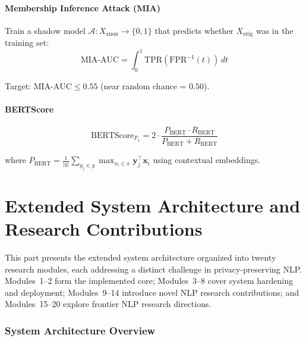 \documentclass[11pt, a4paper]{article}
\newcommand{\Xorig}{X_{\text{orig}}}
\newcommand{\Xanon}{X_{\text{anon}}}
\begin{document}
\subsection{Membership Inference Attack (MIA)}

Train a shadow model $\mathcal{A}: \Xanon \rightarrow \{0, 1\}$ that predicts whether $\Xorig$ was in the training set:
\begin{equation}
\text{MIA-AUC} = \int_0^1 \text{TPR}(\text{FPR}^{-1}(t)) \, dt
\end{equation}

Target: $\text{MIA-AUC} \leq 0.55$ (near random chance = $0.50$).

\subsection{BERTScore}

\begin{equation}
\text{BERTScore}_{F_1} = 2 \cdot \frac{P_{\text{BERT}} \cdot R_{\text{BERT}}}{P_{\text{BERT}} + R_{\text{BERT}}}
\end{equation}

where $P_{\text{BERT}} = \frac{1}{|y|}\sum_{y_j \in y} \max_{x_i \in x} \mathbf{y}_j^\top \mathbf{x}_i$ using contextual embeddings.


\newpage
\part{Extended System Architecture and Research Contributions}

This part presents the extended system architecture organized into twenty research modules, each addressing a distinct challenge in privacy-preserving NLP. Modules~1--2 form the implemented core; Modules~3--8 cover system hardening and deployment; Modules~9--14 introduce novel NLP research contributions; and Modules~15--20 explore frontier NLP research directions.

\section{System Architecture Overview}
\end{document}

